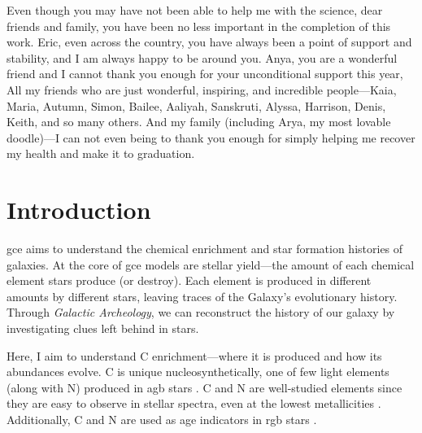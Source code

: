 \documentclass[12pt,oneside,letterpaper]{report}
\newcommand{\agb}{\gls{agb}}
\newcommand{\gce}{\gls{gce}}
\newcommand{\Gce}{\Gls{gce}}
\begin{document}
Even though you may have not been able to help me with the science, dear friends and family, you have been no less important in the completion of this work. 
Eric, even across the country, you have always been a point of support and stability, and I am always happy to be around you. Anya, you are a wonderful friend and I cannot thank you enough for your unconditional support this year, 
All my friends who are just wonderful, inspiring, and incredible people---Kaia, Maria, Autumn, Simon, Bailee, Aaliyah, Sanskruti, Alyssa, Harrison, Denis, Keith, and so many others. 
And my family (including Arya, my most lovable doodle)---I can not even being to thank you enough for simply helping me recover my health and make it to graduation. 









\tableofcontents
\listoffigures
\listoftables
\newpage
{}









\chapter{Introduction}

\Gce{} aims to understand the chemical enrichment and star formation histories of galaxies. At the core of \gce{} models are stellar \gls{yield}---the amount of each chemical element stars produce (or destroy). Each element is produced in different amounts by different stars, leaving traces of the Galaxy's evolutionary history. Through \textit{Galactic Archeology}, we can reconstruct the history of our galaxy by investigating clues left behind in stars.

Here, I aim to understand C enrichment---where it is produced and how its abundances evolve. C is unique nucleosynthetically, one of few light elements (along with N) produced in \agb{} stars \citep[e.g.][]{jennifer19, KL14}. C and N are well-studied elements since they are easy to observe in stellar spectra, even at the lowest metallicities \cite[e.g.][]{fabbian+09, nissen+14, lambert81, laird85, lambert86}. Additionally, C and N are used as age indicators in \gls{rgb} stars \citep{martig16, MG15, hasselquist19, vincenzo+21}.
\end{document}
